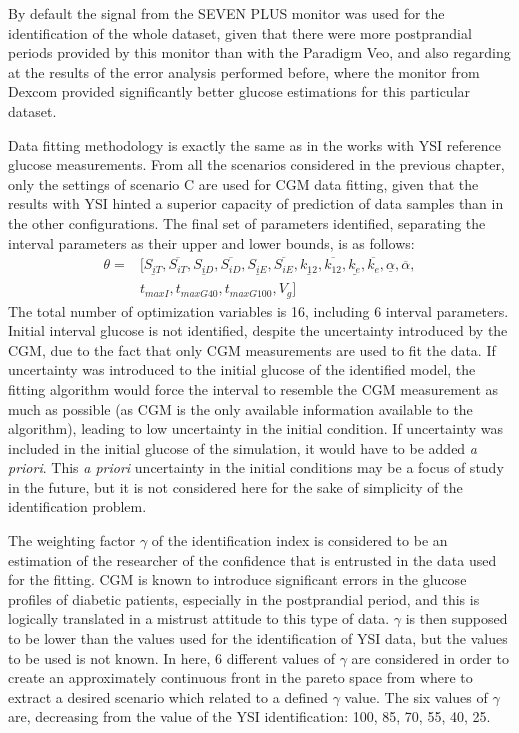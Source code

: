By default the signal from the SEVEN\textsuperscript{\textregistered} PLUS monitor was used for the identification of the whole dataset, given that there were more postprandial periods provided by this monitor than with the Paradigm\textsuperscript{\textregistered} Veo\texttrademark{}, and also regarding at the results of the error analysis performed before, where the monitor from Dexcom provided significantly better glucose estimations for this particular dataset.

Data fitting methodology is exactly the same as in the works with YSI reference glucose measurements. From all the scenarios considered in the previous chapter, only the settings of scenario C are used for CGM data fitting, given that the results with YSI hinted a superior capacity of prediction of data samples than in the other configurations. The final set of parameters identified, separating the interval parameters as their upper and lower bounds, is as follows:
\begin{equation}\label{eq:parametervectorCGMscenarioC}
\begin{split}
\theta=&[\underline{S_{iT}}, \overline{S_{iT}}, \underline{S_{iD}}, \overline{S_{iD}}, \underline{S_{iE}}, \overline{S_{iE}}, \underline{k_{12}}, \overline{k_{12}}, \underline{k_e}, \overline{k_e}, \underline{\alpha}, \overline{\alpha}, \\
& t_{maxI}, t_{maxG40}, t_{maxG100}, V_g ]
\end{split}
\end{equation}
The total number of optimization variables is 16, including 6 interval parameters. Initial interval glucose is not identified, despite the uncertainty introduced by the CGM, due to the fact that only CGM measurements are used to fit the data. If uncertainty was introduced to the initial glucose of the identified model, the fitting algorithm would force the interval to resemble the CGM measurement as much as possible (as CGM is the only available information available to the algorithm), leading to low uncertainty in the initial condition. If uncertainty was included in the initial glucose of the simulation, it would have to be added \textit{a priori}. This \textit{a priori} uncertainty in the initial conditions may be a focus of study in the future, but it is not considered here for the sake of simplicity of the identification problem. 

The weighting factor $\gamma$ of the identification index is considered to be an estimation of the researcher of the confidence that is entrusted in the data used for the fitting. CGM is known to introduce significant errors in the glucose profiles of diabetic patients, especially in the postprandial period, and this is logically translated in a mistrust attitude to this type of data. $\gamma$ is then supposed to be lower than the values used for the identification of YSI data, but the values to be used is not known. In here, 6 different values of $\gamma$ are considered in order to create an approximately continuous front in the pareto space from where to extract a desired scenario which related to a defined $\gamma$ value. The six values of $\gamma$ are, decreasing from the value of the YSI identification: 100, 85, 70, 55, 40, 25.

